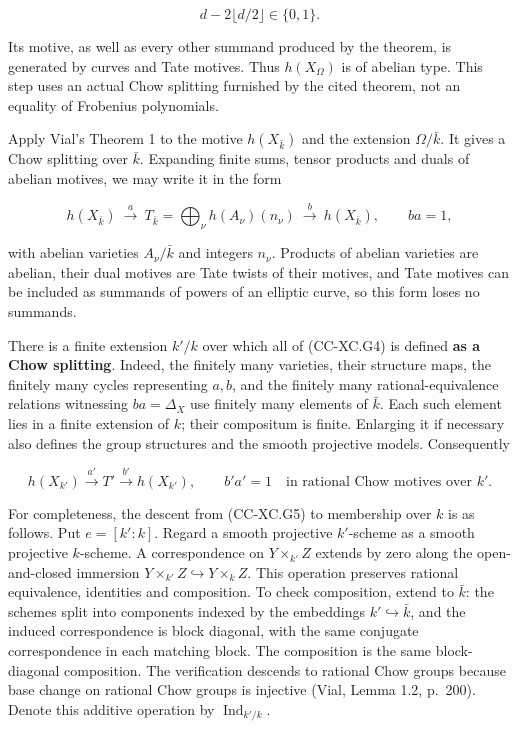\[
                    d-2\lfloor d/2\rfloor\in\{0,1\}.
 \tag{CC-XC.G3}
\]

Its motive, as well as every other summand produced by the theorem, is
generated by curves and Tate motives. Thus \(h(X_\Omega)\) is of abelian
type. This step uses an actual Chow splitting furnished by the cited
theorem, not an equality of Frobenius polynomials.

Apply Vial's Theorem 1 to the motive \(h(X_{\bar k})\) and the extension
\(\Omega/\bar k\). It gives a Chow splitting over \(\bar k\). Expanding
finite sums, tensor products and duals of abelian motives, we may write
it in the form

\[
 h(X_{\bar k})\ \xrightarrow{\ a\ }\
 T_{\bar k}=\bigoplus_\nu h(A_\nu)(n_\nu)
 \ \xrightarrow{\ b\ }\ h(X_{\bar k}),\qquad ba=1,
 \tag{CC-XC.G4}
\]

with abelian varieties \(A_\nu/\bar k\) and integers \(n_\nu\). Products
of abelian varieties are abelian, their dual motives are Tate twists of
their motives, and Tate motives can be included as summands of powers of
an elliptic curve, so this form loses no summands.

There is a finite extension \(k'/k\) over which all of (CC-XC.G4) is
defined \textbf{as a Chow splitting}. Indeed, the finitely many
varieties, their structure maps, the finitely many cycles representing
\(a,b\), and the finitely many rational-equivalence relations witnessing
\(ba=\Delta_X\) use finitely many elements of \(\bar k\). Each such
element lies in a finite extension of \(k\); their compositum is finite.
Enlarging it if necessary also defines the group structures and the
smooth projective models. Consequently

\[
 h(X_{k'})\xrightarrow{a'} T'
       \xrightarrow{b'}h(X_{k'}),\qquad b'a'=1
 \quad\text{in rational Chow motives over }k'.
 \tag{CC-XC.G5}
\]

For completeness, the descent from (CC-XC.G5) to membership over \(k\)
is as follows. Put \(e=[k':k]\). Regard a smooth projective
\(k'\)-scheme as a smooth projective \(k\)-scheme. A correspondence on
\(Y\times_{k'} Z\) extends by zero along the open-and-closed immersion
\(Y\times_{k'} Z\hookrightarrow Y\times_k Z\). This operation preserves
rational equivalence, identities and composition. To check composition,
extend to \(\bar k\): the schemes split into components indexed by the
embeddings \(k'\hookrightarrow\bar k\), and the induced correspondence
is block diagonal, with the same conjugate correspondence in each
matching block. The composition is the same block-diagonal composition.
The verification descends to rational Chow groups because base change on
rational Chow groups is injective (Vial, Lemma 1.2, p.~200). Denote this
additive operation by \(\operatorname{Ind}_{k'/k}\).

